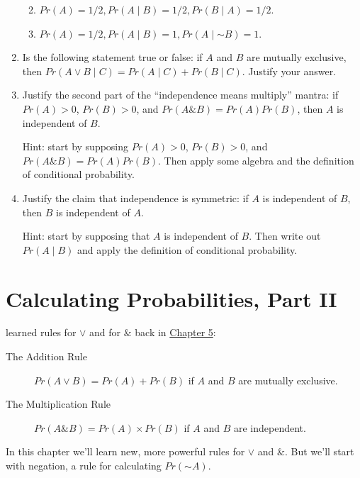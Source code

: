 \documentclass[justified]{tufte-book}
\providecommand{\tightlist}{%
  \setlength{\itemsep}{0pt}\setlength{\parskip}{0pt}}
\newcommand{\given}{\mid}
\renewcommand{\neg}{\mathbin{\sim}}
\renewcommand{\wedge}{\mathbin{\&}}
\newcommand{\p}{Pr}
\theoremstyle{definition}
\theoremstyle{definition}
\theoremstyle{definition}
\theoremstyle{remark}
\begin{document}
\begin{enumerate}
  \begin{enumerate}
  \def\labelenumii{\alph{enumii}.}
  \tightlist
  \item
    \(\p(A) = 1/2, \p(A \given B) = 1/2, \p(B \given A) = 1/2\).
  \item
    \(\p(A) = 1/2, \p(A \given B) = 1, \p(A \given \neg B) = 1\).
  \end{enumerate}
\item
  Is the following statement true or false: if \(A\) and \(B\) are mutually exclusive, then \(Pr(A \vee B \given C) = Pr(A \given C) + Pr(B \given C)\). Justify your answer.
\item
  Justify the second part of the ``independence means multiply'' mantra: if \(\p(A) > 0\), \(\p(B) > 0\), and \(\p(A \wedge B) = \p(A) \p(B)\), then \(A\) is independent of \(B\).

  Hint: start by supposing \(\p(A) > 0\), \(\p(B) > 0\), and \(\p(A \wedge B) = \p(A)\p(B)\). Then apply some algebra and the definition of conditional probability.
\item
  Justify the claim that independence is symmetric: if \(A\) is independent of \(B\), then \(B\) is independent of \(A\).

  Hint: start by supposing that \(A\) is independent of \(B\). Then write out \(\p(A \given B)\) and apply the definition of conditional probability.
\end{enumerate}

\hypertarget{calculating-probabilities-part-ii}{%
\chapter{Calculating Probabilities, Part II}\label{calculating-probabilities-part-ii}}

 learned rules for \(\vee\) and for \(\wedge\) back in \protect\hyperlink{calculating-probabilities}{Chapter 5}:

\begin{description}
\item[The Addition Rule]
\(\p(A \vee B) = \p(A) + \p(B)\) if \(A\) and \(B\) are mutually exclusive.
\item[The Multiplication Rule]
\(\p(A \& B) = \p(A) \times \p(B)\) if \(A\) and \(B\) are independent.
\end{description}

In this chapter we'll learn new, more powerful rules for \(\vee\) and \(\wedge\). But we'll start with negation, a rule for calculating \(\p(\neg A)\).
\end{document}
